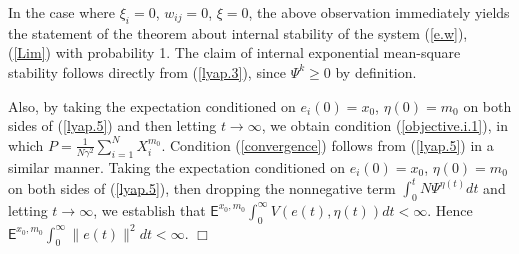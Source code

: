 \documentclass[a4paper,twocolumn]{autart}
\begin{document}
In the case where $\xi_i=0$, $w_{ij}=0$, $\xi=0$, the above observation
immediately yields the statement of the theorem about internal stability of
the system (\ref{e.w}), (\ref{Lim}) with probability
1. The claim of internal exponential mean-square stability follows directly
from (\ref{lyap.3}), since $\Psi^k\ge 0$ by definition.   

Also, by taking the
expectation conditioned on $e_i(0)=x_0$, $\eta(0)=m_0$ on both sides of
(\ref{lyap.5}) and then letting $t\to\infty$, we obtain 
condition (\ref{objective.i.1}), in which $P= \frac{1}{N\gamma^2}
\sum_{i=1}^NX_i^{m_0}$.   
Condition (\ref{convergence}) follows from (\ref{lyap.5}) in a similar
manner. Taking the
expectation conditioned on $e_i(0)=x_0$, $\eta(0)=m_0$ on both sides of
(\ref{lyap.5}), then dropping the nonnegative term $\int_0^tN\Psi^{\eta(t)}dt$ and
letting $t\to\infty$, we establish that
$\mathsf{E}^{x_0,m_0}\int_0^\infty V(e(t),\eta(t)) dt<\infty$. 
Hence $\mathsf{E}^{x_0,m_0}\int_0^\infty\|e(t)\|^2dt <\infty$. 
 \hfill$\Box$ 
\end{document}
